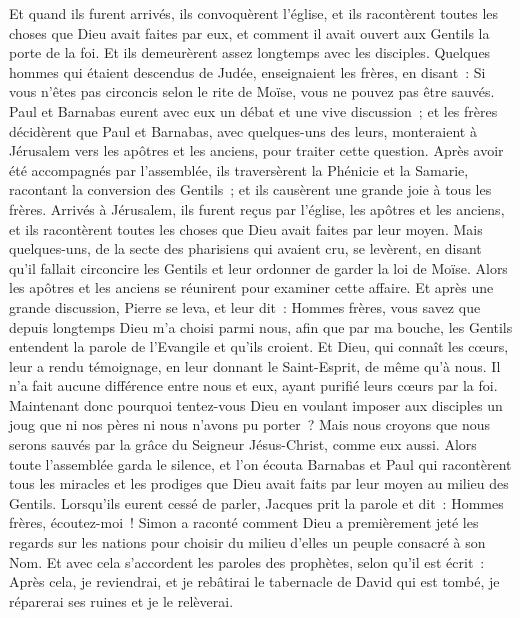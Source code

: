 \begin{multicols}{2}
Et quand ils furent arrivés, ils convoquèrent l'église, et ils racontèrent toutes les choses que Dieu avait faites par eux, et comment il avait ouvert aux Gentils la porte de la foi.
Et ils demeurèrent assez longtemps avec les disciples.
\VerseOne{}Quelques hommes qui étaient descendus de Judée, enseignaient les frères, en disant~: Si vous n'êtes pas circoncis selon le rite de Moïse, vous ne pouvez pas être sauvés.
Paul et Barnabas eurent avec eux un débat et une vive discussion~; et les frères décidèrent que Paul et Barnabas, avec quelques-uns des leurs, monteraient à Jérusalem vers les apôtres et les anciens, pour traiter cette question.
Après avoir été accompagnés par l'assemblée, ils traversèrent la Phénicie et la Samarie, racontant la conversion des Gentils~; et ils causèrent une grande joie à tous les frères.
Arrivés à Jérusalem, ils furent reçus par l'église, les apôtres et les anciens, et ils racontèrent toutes les choses que Dieu avait faites par leur moyen.
Mais quelques-uns, de la secte des pharisiens qui avaient cru, se levèrent, en disant qu'il fallait circoncire les Gentils et leur ordonner de garder la loi de Moïse.
Alors les apôtres et les anciens se réunirent pour examiner cette affaire.
Et après une grande discussion, Pierre se leva, et leur dit~: Hommes frères, vous savez que depuis longtemps Dieu m'a choisi parmi nous, afin que par ma bouche, les Gentils entendent la parole de l'Evangile et qu'ils croient.
Et Dieu, qui connaît les cœurs, leur a rendu témoignage, en leur donnant le Saint-Esprit, de même qu'à nous.
Il n'a fait aucune différence entre nous et eux, ayant purifié leurs cœurs par la foi.
Maintenant donc pourquoi tentez-vous Dieu en voulant imposer aux disciples un joug que ni nos pères ni nous n'avons pu porter~?
Mais nous croyons que nous serons sauvés par la grâce du Seigneur Jésus-Christ, comme eux aussi.
Alors toute l'assemblée garda le silence, et l'on écouta Barnabas et Paul qui racontèrent tous les miracles et les prodiges que Dieu avait faits par leur moyen au milieu des Gentils.
Lorsqu'ils eurent cessé de parler, Jacques prit la parole et dit~: Hommes frères, écoutez-moi~!
Simon a raconté comment Dieu a premièrement jeté les regards sur les nations pour choisir du milieu d'elles un peuple consacré à son Nom. 
Et avec cela s'accordent les paroles des prophètes, selon qu'il est écrit~:
Après cela, je reviendrai, et je rebâtirai le tabernacle de David qui est tombé, je réparerai ses ruines et je le relèverai.

\end{multicols}
